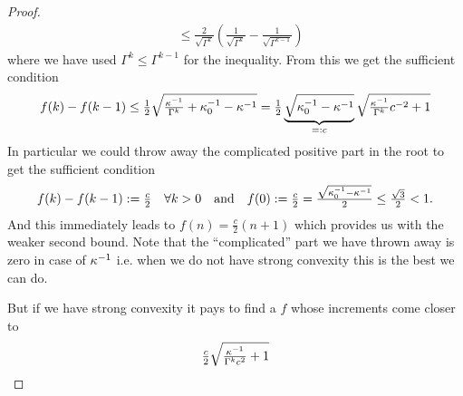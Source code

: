 \begin{proof}
\begin{align*}
		&\le \frac{2}{\sqrt{\Gamma^k}}
		\left(
			\frac{1}{\sqrt{\Gamma^k}}-\frac{1}{\sqrt{\Gamma^{k-1}}}
		\right)
	\end{align*}
	where we have used \(\Gamma^k\le\Gamma^{k-1}\) for the inequality. From
	this we get the sufficient condition
	\begin{align*}
		f(k) - f(k-1)
		\le \tfrac12\sqrt{\tfrac{\kappa^{-1}}{\Gamma^k} + \kappa_0^{-1}-\kappa^{-1}}
		= \tfrac12\underbrace{\sqrt{\kappa_0^{-1}-\kappa^{-1}}}_{=:c}
		\sqrt{\tfrac{\kappa^{-1}}{\Gamma^k}c^{-2} + 1}
	\end{align*}
	In particular we could throw away the complicated positive part in the root
	to get the sufficient condition
	\begin{align*}
		f(k) - f(k-1) := \tfrac{c}2\quad \forall k>0 \quad \text{and}
		\quad f(0):=\tfrac{c}2 = \tfrac{\sqrt{\kappa_0^{-1}-\kappa^{-1}}}2
		\le \tfrac{\sqrt{3}}{2}<1.
	\end{align*}
	And this immediately leads to \(f(n) = \tfrac{c}{2}(n+1)\) which provides us
	with the weaker second bound. Note that the ``complicated'' part we have
	thrown away is zero in case of \(\kappa^{-1}\) i.e. when we do not
	have strong convexity this is the best we can do.
	
	But if we have strong convexity it pays to find a \(f\) whose increments
	come closer to
	\begin{align*}
		\tfrac{c}{2}\sqrt{\tfrac{\kappa^{-1}}{\Gamma^k c^2}+1}
	\end{align*}
\end{proof}


\endinput